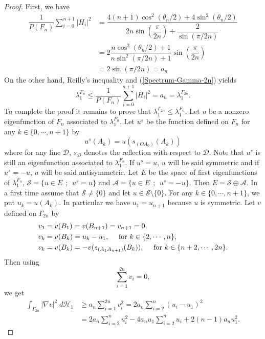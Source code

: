 \documentclass[12pt,english]{smfart} %
\theoremstyle{remark}
\begin{document}
\begin{proof} First, we have
\begin{align*}
\dfrac{1}{P(F_n)}\displaystyle\sum_{i=0}^{n+1}|H_i|^2&=\dfrac{4(n+1)\cos^2\left(\theta_n/2\right)+4\sin^2\left(\theta_n/2\right)}{2n\sin\left(\dfrac{\pi}{2n}\right)+\dfrac{2}{\sin\left(\pi/2n\right)}}\\
&=2\dfrac{n\cos^2\left(\theta_n/2\right)+1}{n\sin^2\left(\pi/2n\right)+1}\sin\left(\dfrac{\pi}{2n}\right)\\
&=2\sin\left(\pi/2n\right)=a_n
\end{align*}
On the other hand, Reilly's inequality and (\ref{Spectrum-Gamma-2n}) yields
\begin{equation}\label{major-lambda1-F_n}
\lambda_1^{F_n}\leqslant\dfrac{1}{P(F_n)}\displaystyle\sum_{i=0}^{n+1}|H_i|^2=a_n=\lambda_1^{\Gamma_{2n}}.
\end{equation}
To complete the proof it remains to prove that $\lambda_1^{\Gamma_{2n}}\leqslant\lambda_1^{F_n}$. Let $u$ be a nonzero eigenfunction of $F_n$ associated to $\lambda_1^{F_n}$. Let $u^s$ be the function defined on $F_n$ for any $k\in\{0,\cdots,n+1\}$ by
$$ u^s(A_k)=u(s_{(OA_0)}(A_k))$$
where for any line $\mathcal{D}$, $s_{\mathcal{D}}$ denotes the reflection with respect to $\mathcal{D}$. Note that $u^s$ is still an eigenfunction associated to $\lambda_1^{F_n}$. If $u^s=u$, $u$ will be said symmetric and if $u^s=-u$, $u$ will be said antisymmetric. Let $E$ be the space of first eigenfunctions of $\lambda_1^{F_n}$, $\mathcal{S}=\{u\in E\ \ ;\ \ u^s=u\}$ and $\mathcal{A}=\{u\in E\ \ ;\ \ u^s=-u\}$. Then $E=\mathcal{S}\oplus\mathcal{A}$. In a first time assume that $\mathcal{S}\neq\{0\}$ and let $u\in\mathcal{S}\setminus\{0\}$. For any $k\in\{0,\cdots,n+1\}$, we put $u_k=u(A_k)$. In particular we have $u_1=u_{n+1}$ because $u$ is symmetric. Let $v$ defined on $\Gamma_{2n}$ by 
\begin{align*}
    v_1&=v(B_1)=v(B_{n+1})=v_{n+1}=0, \\
  v_k&=v(B_k)=u_k-u_1, \quad \textnormal{ for } k\in\{2,\cdots,n\},\\
    v_k&=v(B_k)=-v(s_{(A_1A_{n+1})}(B_k)), \quad \textnormal{ for } k\in\{n+2,\cdots,2n\}.
\end{align*}
Then using $$\sum_{i=1}^{2n}v_i=0,$$ we get 
\begin{align*}
\int_{\Gamma_{2n}}|\nabla v|^2\;d\mathcal{H}_1&\geqslant a_n\sum_{i=1}^{2n}v_i^2=2a_n\sum_{i=2}^{n}(u_i-u_1)^2\\
&=2a_n\sum_{i=2}^{n}u_i^2-4a_nu_1\sum_{i=2}^{n}u_i+2(n-1)a_nu_1^2.

\end{align*}
\end{proof}
\end{document}
